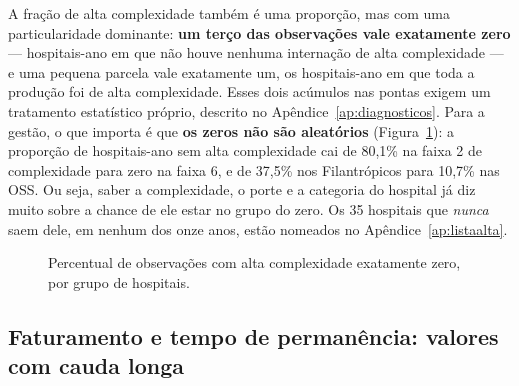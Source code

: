 A fração de alta complexidade também é uma proporção, mas com uma
particularidade dominante: \textbf{um terço das observações vale
exatamente zero} --- hospitais-ano em que não houve nenhuma internação de
alta complexidade --- e uma pequena parcela vale exatamente um, os
hospitais-ano em que toda a produção foi de alta complexidade. Esses dois
acúmulos nas pontas exigem um tratamento estatístico próprio, descrito no
Apêndice~\ref{ap:diagnosticos}. Para a gestão, o que importa é que
\textbf{os zeros não são aleatórios} (Figura~\ref{fig:zeros}): a proporção
de hospitais-ano sem alta complexidade cai de 80,1\% na faixa 2 de
complexidade para zero na faixa 6, e de 37,5\% nos Filantrópicos para
10,7\% nas OSS. Ou seja, saber a complexidade, o porte e a categoria do
hospital já diz muito sobre a chance de ele estar no grupo do zero. Os 35
hospitais que \emph{nunca} saem dele, em nenhum dos onze anos, estão
nomeados no Apêndice~\ref{ap:listaalta}.
\newpage
{}

\begin{figure}[H]
\centering
{}
\caption{Percentual de observações com alta complexidade exatamente
zero, por grupo de hospitais.}
\label{fig:zeros}
\end{figure}


\newpage
\subsection{Faturamento e tempo de permanência: valores com cauda
longa}

